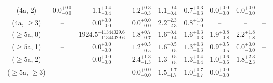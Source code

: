 \begin{table}[h!]
{\begin{tabular}{ccccccccc}
	(4a, 2) & $0.0^{+ 0.0 }_{- 0.0 }$ & $1.1^{+ 0.4 }_{- 0.4 }$ & $1.2^{+ 0.3 }_{- 0.3 }$ & $1.1^{+ 0.4 }_{- 0.4 }$ & $0.7^{+ 0.3 }_{- 0.3 }$ & $0.0^{+ 0.0 }_{- 0.0 }$ & $0.0^{+ 0.0 }_{- 0.0 }$ & -- \\[0.5ex] 
	(4a, $\ge3$) & -- & $0.0^{+ 0.0 }_{- 0.0 }$ & $0.0^{+ 0.0 }_{- 0.0 }$ & $2.2^{+ 2.3 }_{- 2.3 }$ & $0.8^{+ 1.0 }_{- 1.0 }$ & -- & -- & -- \\[0.5ex] 
	($\ge5$a, 0) & -- & $1924.5^{+ 11344029.6 }_{- 11344029.6 }$ & $1.8^{+ 0.7 }_{- 0.7 }$ & $1.6^{+ 0.4 }_{- 0.4 }$ & $1.6^{+ 0.3 }_{- 0.3 }$ & $1.9^{+ 0.8 }_{- 0.8 }$ & $2.2^{+ 1.8 }_{- 1.8 }$ & -- \\[0.5ex] 
	($\ge5$a, 1) & -- & $0.0^{+ 0.0 }_{- 0.0 }$ & $1.2^{+ 0.5 }_{- 0.5 }$ & $1.6^{+ 0.5 }_{- 0.5 }$ & $1.3^{+ 0.3 }_{- 0.3 }$ & $0.9^{+ 0.5 }_{- 0.5 }$ & $0.0^{+ 0.0 }_{- 0.0 }$ & -- \\[0.5ex] 
	($\ge5$a, 2) & -- & $0.0^{+ 0.0 }_{- 0.0 }$ & $2.4^{+ 1.3 }_{- 1.3 }$ & $1.3^{+ 0.5 }_{- 0.5 }$ & $1.3^{+ 0.4 }_{- 0.4 }$ & $1.0^{+ 0.6 }_{- 0.6 }$ & $1.8^{+ 2.3 }_{- 2.3 }$ & -- \\[0.5ex] 
	($\ge5$a, $\ge3$) & -- & -- & $0.0^{+ 0.0 }_{- 0.0 }$ & $1.5^{+ 1.7 }_{- 1.7 }$ & $1.0^{+ 0.7 }_{- 0.7 }$ & $0.0^{+ 0.0 }_{- 0.0 }$ & -- & -- \\[0.5ex] 
	\hline
	\hline
\end{tabular}}
\end{table}
